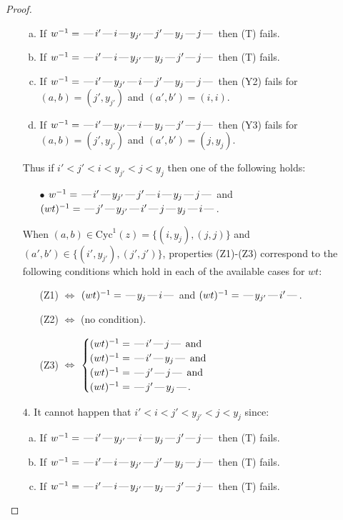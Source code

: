 \documentclass[10pt]{article}
\theoremstyle{definition}
\theoremstyle{definition}
\def\dash{\text{\hspace{0.5mm}---\hspace{0.5mm}}}
\def\Cyc{\mathrm{Cyc}}
\begin{document}
\begin{proof}
\begin{enumerate}
\begin{enumerate}[(a)]
\item If $w^{-1} = \dash i'\dash i\dash y_{j'}\dash j'\dash y_j\dash j\dash $ then (T) fails.
\item If $w^{-1} = \dash i'\dash i\dash y_{j'}\dash y_j\dash j'\dash j\dash $ then (T) fails.
\item If $w^{-1} = \dash i'\dash y_{j'}\dash i\dash j'\dash y_j\dash j\dash $ then (Y2) fails for $(a,b)=(j',y_{j'})$ and $(a',b')=(i,i)$.
\item If $w^{-1} = \dash i'\dash y_{j'}\dash i\dash y_j\dash j'\dash j\dash $ then (Y3) fails for $(a,b)=(j',y_{j'})$ and $(a',b')=(j,y_j)$.
\end{enumerate}
Thus if $i' < j' < i < y_{j'} < j < y_j$ then one of the following holds:
\begin{enumerate}
\item[$\bullet$] $w^{-1} = \dash i'\dash y_{j'}\dash j'\dash i\dash y_j\dash j\dash $ and $(wt)^{-1} = \dash j'\dash y_{j'}\dash i'\dash j\dash y_j\dash i\dash $.
\end{enumerate}
When $(a,b)\in\Cyc^1(z)=\{(i,y_j),(j,j)\}$ and $(a',b')\in\{(i',y_{j'}),(j',j')\}$,
properties (Z1)-(Z3) correspond to the following conditions which
hold in each of the available cases for $wt$:
\begin{enumerate}
\item[](Z1) $\Leftrightarrow$ $(wt)^{-1} = \dash y_j \dash i \dash$  and $(wt)^{-1} = \dash y_{j'} \dash i' \dash$.
\item[](Z2) $\Leftrightarrow$ (no condition).
\item[](Z3) $\Leftrightarrow$ $\begin{cases}\text{$(wt)^{-1} = \dash i' \dash j \dash$}\text{ and }\\
\text{$(wt)^{-1} = \dash i' \dash y_j \dash$}\text{ and }\\
\text{$(wt)^{-1} = \dash j' \dash j \dash$}\text{ and }\\
\text{$(wt)^{-1} = \dash j' \dash y_j \dash$}.\end{cases}$
\end{enumerate}
\item[$4$.] It cannot happen that $i' < i < j' < y_{j'} < j < y_j$ since:
\begin{enumerate}[(a)]
\item If $w^{-1} = \dash i'\dash y_{j'}\dash i\dash y_j\dash j'\dash j\dash $ then (T) fails.
\item If $w^{-1} = \dash i'\dash i\dash y_{j'}\dash j'\dash y_j\dash j\dash $ then (T) fails.
\item If $w^{-1} = \dash i'\dash i\dash y_{j'}\dash y_j\dash j'\dash j\dash $ then (T) fails.

\end{enumerate}
\end{enumerate}
\end{proof}
\end{document}
